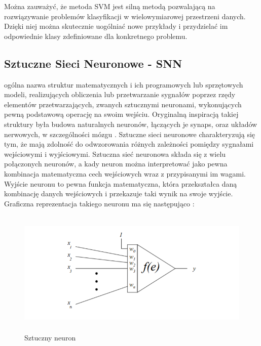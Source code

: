 Można zauważyć, że metoda SVM jest silną metodą pozwalającą na rozwiązywanie problemów klasyfikacji w wielowymiarowej przestrzeni danych. Dzięki niej można skutecznie uogólniać nowe przykłady i przydzielać im odpowiednie klasy zdefiniowane dla konkretnego problemu.

\newpage

\subsection{Sztuczne Sieci Neuronowe - SNN}
\label{SNN-opis}

 ogólna nazwa struktur matematycznych i ich programowych lub sprzętowych modeli, realizujących obliczenia lub przetwarzanie sygnałów poprzez rzędy elementów przetwarzających, zwanych sztucznymi neuronami, wykonujących pewną podstawową operację na swoim wejściu. Oryginalną inspiracją takiej struktury była budowa naturalnych neuronów, łączących je synaps, oraz układów nerwowych, w szczególności mózgu \cite{Wiki:SNN}. Sztuczne sieci neuronowe charakteryzują się tym, że mają zdolność do odwzorowania różnych zależności pomiędzy sygnałami wejściowymi i wyjściowymi. Sztuczna sieć neuronowa składa się z wielu połączonych neuronów, a kady neuron można interpretować jako pewna kombinacja matematyczna cech wejściowych wraz z przypisanymi im wagami. Wyjście neuronu to pewna funkcja matematyczna, która przekształca daną kombinację danych wejściowych i przekazuje taki wynik na swoje wyjście. Graficzna reprezentacja takiego neuronu ma się następująco \cite{Prezentacja:SNN,KrawiecStefanowski03}:
\begin{figure}[H] 
        \centering\includegraphics[width=12cm,height=6cm]{figures/SNN.png}
        \caption{Sztuczny neuron}\label{SVM-neuron}
\end{figure}

